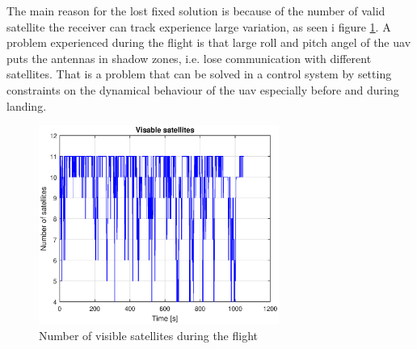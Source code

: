 The main reason for the lost fixed solution is because of the number of valid satellite the receiver can track experience large variation, as seen i figure \ref{figure:numSatFlight}. A problem experienced during the flight is that large roll and pitch angel of the \gls{uav} puts the antennas in shadow zones, i.e. lose communication with different satellites. That is a problem that can be solved in a control system by setting constraints on the dynamical behaviour of the \gls{uav} especially before and during landing.
\begin{figure}[H]
	\centering
		\includegraphics[width=0.7\textwidth]{figs/plots/numSatFlight.eps}
		\caption{Number of visible satellites during the flight}
		\label{figure:numSatFlight}
\end{figure}
